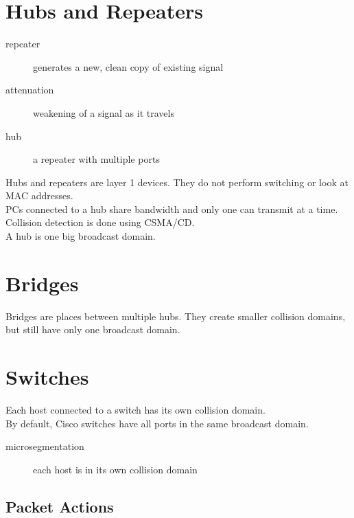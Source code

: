 \documentclass{article}
\begin{document}
\section{Hubs and Repeaters}

\begin{description}

\item[repeater]
generates a new, clean copy of existing signal

\item[attenuation]
weakening of a signal as it travels

\item[hub]
a repeater with multiple ports

\end{description}

Hubs and repeaters are layer 1 devices. They do not perform switching or look
at MAC addresses.\\

PCs connected to a hub share bandwidth and only one can transmit at a time.
Collision detection is done using CSMA/CD.\\

A hub is one big broadcast domain.

\section{Bridges}

Bridges are places between multiple hubs. They create smaller collision
domains, but still have only one broadcast domain.

\section{Switches}

Each host connected to a switch has its own collision domain.\\

By default, Cisco switches have all ports in the same broadcast domain.

\begin{description}

\item[microsegmentation]
each host is in its own collision domain

\end{description}

\subsection{Packet Actions}
\end{document}
